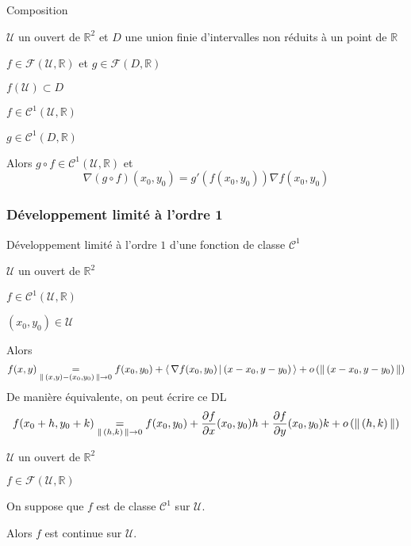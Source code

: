     \begin{prop}{Composition}{}
        \begin{soient}
            \item $ \mathcal{U}$ un ouvert de $\mathbb{R}^2$ et $D$ une union finie d’intervalles non réduits à un point de $\mathbb{R}$
            \item $f \in \mathcal{F}(\mathcal{U},\mathbb{R})$ et $g \in \mathcal{F}(D,\mathbb{R})$
        \end{soient}
        \begin{suppose}
            \item $f(\mathcal{U}) \subset D$
            \item $f \in \mathcal{C}^1(\mathcal{U},\mathbb{R})$
            \item $g \in \mathcal{C}^1(D,\mathbb{R})$
        \end{suppose}
        Alors $g \circ f \in \mathcal{C}^1(\mathcal{U},\mathbb{R})$ et 
        \[ \nabla (g \circ f)(x_0,y_0) = g'(f(x_0,y_0)) \nabla f(x_0,y_0) \] 
    \end{prop}

    \subsubsection{Développement limité à l’ordre 1}

    \begin{theo}{Développement limité à l’ordre $1$ d’une fonction de classe $\mathcal{C}^1$}{}
        \begin{soient}
            \item $\mathcal{U}$ un ouvert de $\mathbb{R}^2$
            \item $f\in \mathcal{C}^1(\mathcal{U},\mathbb{R})$
            \item $(x_0,y_0) \in \mathcal{U}$
        \end{soient}
        Alors \[  f(x,y) \underset{\left\lVert\,(x,y)-(x_0,y_0)\,\right\rVert \rightarrow 0}{=} f(x_0,y_0) + \left<\,\nabla f(x_0,y_0)\,\middle|\,(x-x_0,y-y_0)\,\right> + o\left(\left\lVert\,(x-x_0,y-y_0)\,\right\rVert\right) \]
        De manière équivalente, on peut écrire ce DL
        \[ f(x_0 + h,y_0 + k) \underset{\left\lVert\,(h,k)\,\right\rVert \rightarrow 0}{=} f(x_0,y_0) + \frac{\partial f}{\partial x}(x_0,y_0) h + \frac{\partial f}{\partial y}(x_0,y_0)k + o\left(\left\lVert\,(h,k)\,\right\rVert\right) \]
    \end{theo}

    \begin{coro}{}{}
        \begin{soient}
            \item $\mathcal{U}$ un ouvert de $\mathbb{R}^2$
            \item $f\in \mathcal{F}(\mathcal{U},\mathbb{R})$
        \end{soient}
        On suppose que $f$ est de classe $\mathcal{C}^1$ sur $\mathcal{U}$.

        Alors $f$ est continue sur $\mathcal{U}$.
    \end{coro}

